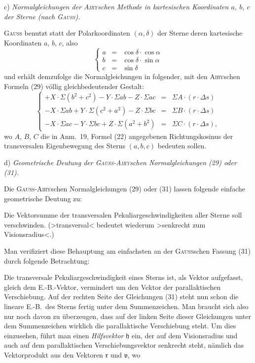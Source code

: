 \documentclass[12pt,a4paper]{article}
\theoremstyle{plain}
\theoremstyle{definition}
\theoremstyle{remark}
\begin{document}
\newpage
\begin{small}
c) \textit{Normalgleichungen der \textsc{Airy}schen Methode in kartesischen Koordinaten
$a$, $b$, $c$ der Sterne (nach \textsc{Gauss}).}

\textsc{Gauss} benutzt statt der Polarkoordinaten $(\alpha, \delta)$ der Sterne deren
kartesische Koordinaten $a$, $b$, $c$, also
\begin{equation}\tag{30}
\left\{\begin{array}{rcl}
a & = & \cos\delta\cdot\cos\alpha\\
b & = & \cos\delta\cdot\sin\alpha\\
c & = & \sin\delta
\end{array}\right.\end{equation}
und erh\"alt demzufolge die Normalgleichungen in folgender, mit den \textsc{Airy}schen
Formeln (29) v\"ollig gleichbedeutender Gestalt:
\begin{equation}\tag{31}
\left\{\begin{array}{rcl}
+X\cdot\Sigma(b^{2}+c^{2}) - Y\cdot\Sigma ab - Z\cdot\Sigma ac & = &
\Sigma A\cdot(r\cdot\Delta s)\\
-X\cdot\Sigma ab + Y\cdot\Sigma(c^{2}+a^{2}) - Z\cdot\Sigma bc & = &
\Sigma B\cdot(r\cdot\Delta s)\\
-X\cdot\Sigma ac - Y\cdot\Sigma bc + Z\cdot\Sigma(a^{2}+b^{2}) & = &
\Sigma C\cdot(r\cdot\Delta s),
\end{array}\right.\end{equation}
wo $A$, $B$, $C$ die in Anm.~19, Formel (22) angegebenen Richtungskosinus der
transversalen Eigenbewegung des Sterns $(a, b, c)$ bedeuten sollen.

d) \textit{Geometrische Deutung der \textsc{Gauss-Airy}schen Normalgleichungen (29) oder
(31).}

Die \textsc{Gauss-Airy}schen Normalgleichungen (29) oder (31) lassen folgende einfache
geometrische Deutung zu:

Die Vektorsumme der transversalen Pekuliargeschwindigkeiten aller Sterne soll
verschwinden. (\textgreater{}transversal\textless{} bedeutet wiederum \textgreater{}senkrecht zum Visionsradius\textless{}.)

Man verifiziert diese Behauptung am einfachsten an der \textsc{Gauss}schen Fassung
(31) durch folgende Betrachtung:

Die transversale Pekuliargeschwindigkeit eines Sterns ist, als Vektor aufgefasst,
gleich dem E.-B.-Vektor, vermindert um den Vektor der parallaktischen Verschiebung.
Auf der rechten Seite der Gleichungen (31) steht nun schon die lineare E.-B.~des
Sterns fertig unter dem Summenzeichen. Man braucht sich also nur noch davon zu
\"uberzeugen, dass auf der linken Seite dieser Gleichungen unter dem Summenzeichen
wirklich die parallaktische Verschiebung steht. Um dies einzusehen, f\"uhrt man
einen \textit{Hilfsvektor} $\mathfrak{h}$ ein, der auf dem Visionsradius und auch auf dem
parallaktischen Verschiebungsvektor senkrecht steht, n\"amlich das Vektorprodukt
aus den Vektoren $\mathfrak{r}$ und $\mathfrak{v}$, wo


\end{small}
\end{document}

